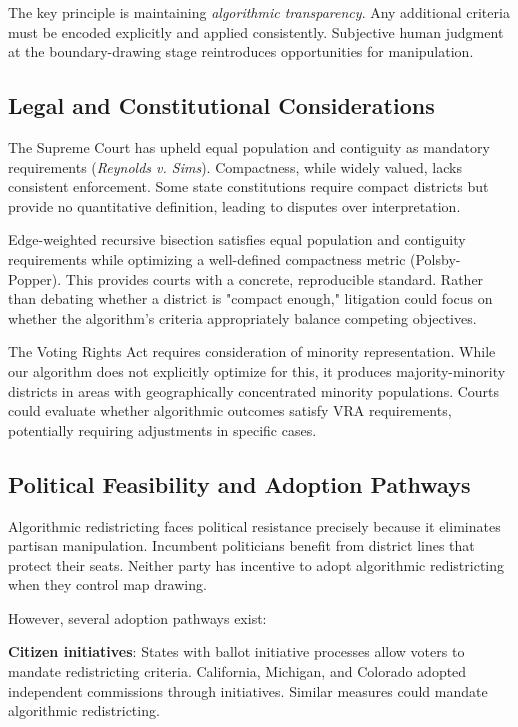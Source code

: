 The key principle is maintaining \textit{algorithmic transparency}. Any additional criteria must be encoded explicitly and applied consistently. Subjective human judgment at the boundary-drawing stage reintroduces opportunities for manipulation.

\subsection{Legal and Constitutional Considerations}

The Supreme Court has upheld equal population and contiguity as mandatory requirements (\textit{Reynolds v. Sims}). Compactness, while widely valued, lacks consistent enforcement. Some state constitutions require compact districts but provide no quantitative definition, leading to disputes over interpretation.

Edge-weighted recursive bisection satisfies equal population and contiguity requirements while optimizing a well-defined compactness metric (Polsby-Popper). This provides courts with a concrete, reproducible standard. Rather than debating whether a district is "compact enough," litigation could focus on whether the algorithm's criteria appropriately balance competing objectives.

The Voting Rights Act requires consideration of minority representation. While our algorithm does not explicitly optimize for this, it produces majority-minority districts in areas with geographically concentrated minority populations. Courts could evaluate whether algorithmic outcomes satisfy VRA requirements, potentially requiring adjustments in specific cases.

\subsection{Political Feasibility and Adoption Pathways}

Algorithmic redistricting faces political resistance precisely because it eliminates partisan manipulation. Incumbent politicians benefit from district lines that protect their seats. Neither party has incentive to adopt algorithmic redistricting when they control map drawing.

However, several adoption pathways exist:

\textbf{Citizen initiatives}: States with ballot initiative processes allow voters to mandate redistricting criteria. California, Michigan, and Colorado adopted independent commissions through initiatives. Similar measures could mandate algorithmic redistricting.

